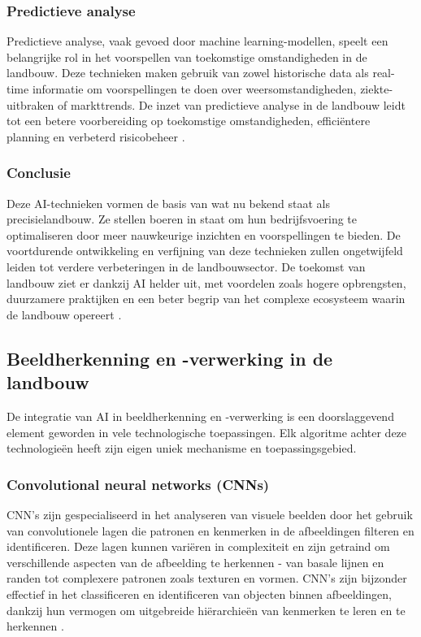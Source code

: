 \subsubsection{Predictieve analyse}
Predictieve analyse, vaak gevoed door machine learning-modellen, speelt een belangrijke rol in het voorspellen van toekomstige omstandigheden in de landbouw. Deze technieken maken gebruik van zowel historische data als real-time informatie om voorspellingen te doen over weersomstandigheden, ziekte-uitbraken of markttrends. De inzet van predictieve analyse in de landbouw leidt tot een betere voorbereiding op toekomstige omstandigheden, efficiëntere planning en verbeterd risicobeheer \autocite{akhter2022precision}.
\subsubsection{Conclusie}
Deze AI-technieken vormen de basis van wat nu bekend staat als precisielandbouw. Ze stellen boeren in staat om hun bedrijfsvoering te optimaliseren door meer nauwkeurige inzichten en voorspellingen te bieden. De voortdurende ontwikkeling en verfijning van deze technieken zullen ongetwijfeld leiden tot verdere verbeteringen in de landbouwsector. De toekomst van landbouw ziet er dankzij AI helder uit, met voordelen zoals hogere opbrengsten, duurzamere praktijken en een beter begrip van het complexe ecosysteem waarin de landbouw opereert \autocite{bhat2021big}.

\subsection{Beeldherkenning en -verwerking in de landbouw}
De integratie van AI in beeldherkenning en -verwerking is een doorslaggevend element geworden in vele technologische toepassingen. Elk algoritme achter deze technologieën heeft zijn eigen uniek mechanisme en toepassingsgebied.

\subsubsection{Convolutional neural networks (CNNs)}
CNN's zijn gespecialiseerd in het analyseren van visuele beelden door het gebruik van convolutionele lagen die patronen en kenmerken in de afbeeldingen filteren en identificeren. Deze lagen kunnen variëren in complexiteit en zijn getraind om verschillende aspecten van de afbeelding te herkennen - van basale lijnen en randen tot complexere patronen zoals texturen en vormen. CNN's zijn bijzonder effectief in het classificeren en identificeren van objecten binnen afbeeldingen, dankzij hun vermogen om uitgebreide hiërarchieën van kenmerken te leren en te herkennen \autocite{sharma2018analysis}.
